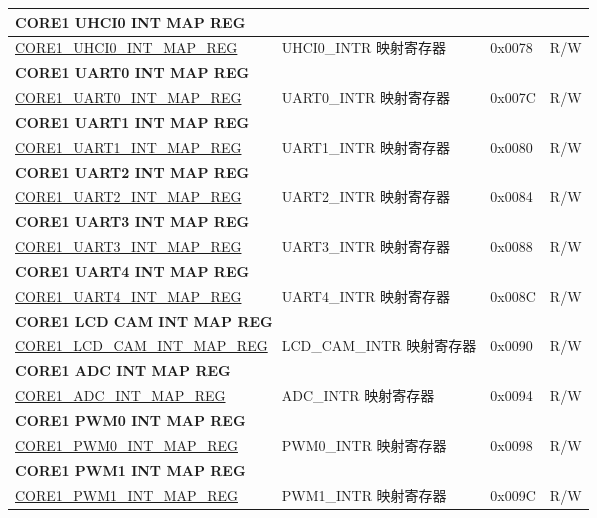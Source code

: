 \begin{longtable}{ | p{7.5cm} | p{7.2cm} | p{1.3cm} | p{1cm} | }
\multicolumn{4}{|l|}{\textbf{CORE1 UHCI0 INT MAP REG}} \\ \hline
\hyperref[regdesc:CORE1UHCI0INTMAPREG]{CORE1\_UHCI0\_INT\_MAP\_REG} & UHCI0\_INTR 映射寄存器 & 0x0078 & R/W \\ \hline
\multicolumn{4}{|l|}{\textbf{CORE1 UART0 INT MAP REG}} \\ \hline
\hyperref[regdesc:CORE1UART0INTMAPREG]{CORE1\_UART0\_INT\_MAP\_REG} & UART0\_INTR 映射寄存器 & 0x007C & R/W \\ \hline
\multicolumn{4}{|l|}{\textbf{CORE1 UART1 INT MAP REG}} \\ \hline
\hyperref[regdesc:CORE1UART1INTMAPREG]{CORE1\_UART1\_INT\_MAP\_REG} & UART1\_INTR 映射寄存器 & 0x0080 & R/W \\ \hline
\multicolumn{4}{|l|}{\textbf{CORE1 UART2 INT MAP REG}} \\ \hline
\hyperref[regdesc:CORE1UART2INTMAPREG]{CORE1\_UART2\_INT\_MAP\_REG} & UART2\_INTR 映射寄存器 & 0x0084 & R/W \\ \hline
\multicolumn{4}{|l|}{\textbf{CORE1 UART3 INT MAP REG}} \\ \hline
\hyperref[regdesc:CORE1UART3INTMAPREG]{CORE1\_UART3\_INT\_MAP\_REG} & UART3\_INTR 映射寄存器 & 0x0088 & R/W \\ \hline
\multicolumn{4}{|l|}{\textbf{CORE1 UART4 INT MAP REG}} \\ \hline
\hyperref[regdesc:CORE1UART4INTMAPREG]{CORE1\_UART4\_INT\_MAP\_REG} & UART4\_INTR 映射寄存器 & 0x008C & R/W \\ \hline
\multicolumn{4}{|l|}{\textbf{CORE1 LCD CAM INT MAP REG}} \\ \hline
\hyperref[regdesc:CORE1LCDCAMINTMAPREG]{CORE1\_LCD\_CAM\_INT\_MAP\_REG} & LCD\_CAM\_INTR 映射寄存器 & 0x0090 & R/W \\ \hline
\multicolumn{4}{|l|}{\textbf{CORE1 ADC INT MAP REG}} \\ \hline
\hyperref[regdesc:CORE1ADCINTMAPREG]{CORE1\_ADC\_INT\_MAP\_REG} & ADC\_INTR 映射寄存器 & 0x0094 & R/W \\ \hline
\multicolumn{4}{|l|}{\textbf{CORE1 PWM0 INT MAP REG}} \\ \hline
\hyperref[regdesc:CORE1PWM0INTMAPREG]{CORE1\_PWM0\_INT\_MAP\_REG} & PWM0\_INTR 映射寄存器 & 0x0098 & R/W \\ \hline
\multicolumn{4}{|l|}{\textbf{CORE1 PWM1 INT MAP REG}} \\ \hline
\hyperref[regdesc:CORE1PWM1INTMAPREG]{CORE1\_PWM1\_INT\_MAP\_REG} & PWM1\_INTR 映射寄存器 & 0x009C & R/W \\ \hline

\end{longtable}
